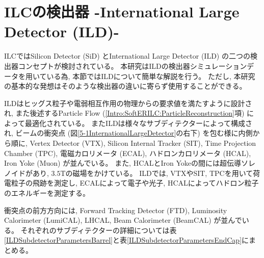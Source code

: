 \section{ILCの検出器 -International Large Detector (ILD)-} \label{Intro:InternationalLargeDetector}

ILCではSilicon Detector (SiD) とInternational Large Detector (ILD) の二つの検出器コンセプトが検討されている。
本研究はILDの検出器シミュレーションデータを用いている為, 本節ではILDについて簡単な解説を行う。
ただし, 本研究の基本的な発想はそのような検出器の違いに寄らず使用することができる。

ILDはヒッグス粒子や電弱相互作用の物理からの要求値を満たすように設計され, また後述するParticle Flow (\ref{Intro:SoftERILC:ParticleReconstruction}項) によって最適化されている。
またILDは様々なサブディテクターによって構成され, ビームの衝突点 (図\ref{5-1InternationalLargeDetector}の右下) を包む様に内側から順に, Vertex Detector (VTX), Silicon Internal Tracker (SIT), Time Projection Chamber (TPC), 電磁カロリメータ (ECAL), ハドロンカロリメータ (HCAL), Iron Yoke (Muon) が並んでいる。
また, HCALとIron Yokeの間には超伝導ソレノイドがあり, $3.5 \mathrm{T}$の磁場をかけている。
ILDでは, VTXやSIT, TPCを用いて荷電粒子の飛跡を測定し, ECALによって電子や光子, HCALによってハドロン粒子のエネルギーを測定する。

衝突点の前方方向には, Forward Tracking Detector (FTD), Luminosity Calorimeter (LumiCAL), LHCAL, Beam Calorimeter (BeamCAL) が並んでいる。
それぞれのサブディテクターの詳細については表\ref{ILDSubdetectorParametersBarrel}と表\ref{ILDSubdetectorParametersEndCap}にまとめる。

